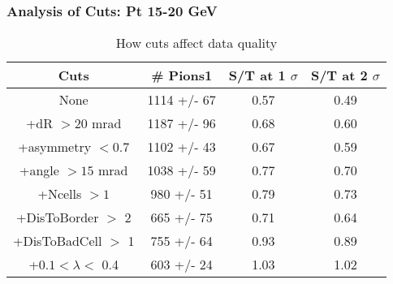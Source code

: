 \frame
{
\frametitle{Analysis of Cuts: Pt 15-20 GeV}
\begin{table}
\caption{How cuts affect data quality}
\centering
\begin{tabular}{c c c c}
\hline\hline
Cuts & \# Pions1 & S/T at 1 $\sigma$ & S/T at 2 $\sigma$ \\ [0.5ex]
\hline
None & 1114 +/-   67 & 0.57 & 0.49 \\ %
+dR $> 20$ mrad & 1187 +/-   96 & 0.68 & 0.60 \\ %
+asymmetry $< 0.7$ & 1102 +/-   43 & 0.67 & 0.59 \\ %
+angle $> 15$ mrad & 1038 +/-   59 & 0.77 & 0.70 \\ %
+Ncells $> 1$&  980 +/-   51 & 0.79 & 0.73 \\ %
+DisToBorder $>$ 2 &  665 +/-   75 & 0.71 & 0.64 \\ %
+DisToBadCell $>$ 1&  755 +/-   64 & 0.93 & 0.89 \\ %
+$0.1 < \lambda <$ 0.4 &  603 +/-   24 & 1.03 & 1.02 \\ %
[1ex]
\hline
\end{tabular}
\label{table:nonlin}
\end{table}
}
